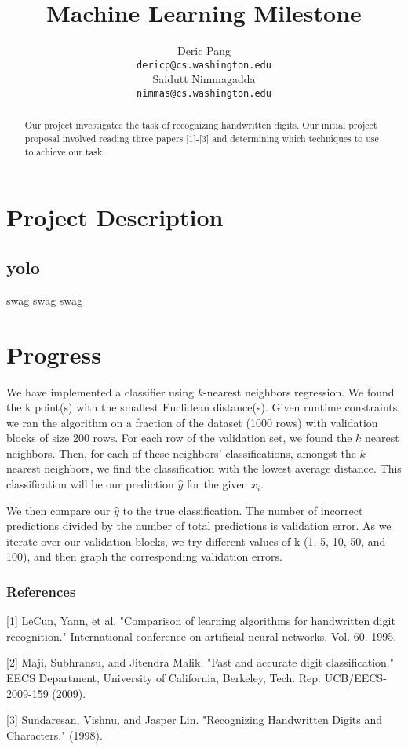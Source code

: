 \documentclass{article} %
\title{Machine Learning Milestone}
\author{
Deric Pang \\
\texttt{dericp@cs.washington.edu} \\
\And
Saidutt Nimmagadda \\
\texttt{nimmas@cs.washington.edu} \\
}
\begin{document}
\maketitle

\begin{abstract}
Our project investigates the task of recognizing handwritten digits. Our initial
project proposal involved reading three papers [1]-[3] and determining which
techniques to use to achieve our task.
\end{abstract}

\section{Project Description}

\subsection{yolo}
swag swag swag

\section{Progress}
We have implemented a classifier using $k$-nearest neighbors regression. 
We found the k point(s) with the smallest Euclidean distance(s). Given runtime constraints,
we ran the algorithm on a fraction of the dataset (1000 rows) with validation blocks of
size 200 rows. For each row of the validation set, we found the $k$ nearest neighbors. Then, for
each of these neighbors' classifications, amongst the $k$ nearest neighbors, we find the classification
with the lowest average distance. This classification will be our prediction $\hat{y}$ for the given $x_i$.

We then compare our $\hat{y}$ to the true classification. The number of incorrect predictions divided by
the number of total predictions is validation error. As we iterate over our validation blocks,
we try different values of k (1, 5, 10, 50, and 100), and then graph the corresponding validation errors.

\subsubsection*{References}

\small{
  [1] LeCun, Yann, et al. "Comparison of learning algorithms for handwritten
  digit recognition." International conference on artificial neural networks.
  Vol. 60. 1995.	

  [2] Maji, Subhransu, and Jitendra Malik. "Fast and accurate digit
  classification." EECS Department, University of California,
  Berkeley, Tech. Rep. UCB/EECS-2009-159 (2009).

  [3] Sundaresan, Vishnu, and Jasper Lin. "Recognizing Handwritten Digits and
  Characters." (1998).
}
\end{document}
